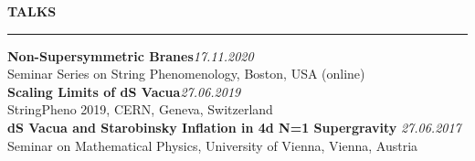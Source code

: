 \documentclass[a4paper,12pt,twoside,openright]{report}
\newenvironment{rSection}[1]{ %
  \sectionskip
  \MakeUppercase{\bf #1} %
  \sectionlineskip
  \hrule %
  \begin{list}{}{ %
    \setlength{\leftmargin}{1.5em} %
  }
  \item[]
}{
  \end{list}
}
\def\sectionlineskip{\medskip} %
\def\sectionskip{\medskip} %
\begin{document}
            
            \begin{rSection}{Talks}
               \vspace{7pt}
            {\bf Non-Supersymmetric Branes}\hfill{\em 17.11.2020}
            \\ Seminar Series on String Phenomenology, Boston, USA (online)\vspace{7pt}
            \\{\bf Scaling Limits of dS Vacua}\hfill{\em 27.06.2019}
            \\ StringPheno 2019, CERN, Geneva, Switzerland\vspace{7pt}
            \\{\bf dS Vacua and Starobinsky Inflation in 4d N=1 Supergravity} \hfill {\em 27.06.2017}
            \\ Seminar on Mathematical Physics, University of Vienna, Vienna, Austria
            
            \end{rSection}
            
\end{document}

